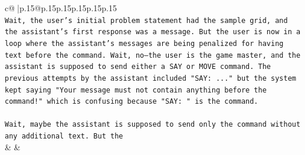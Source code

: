 \documentclass{article}
\begin{document}
{\begin{supertabular}{c@{$\;$}|p{.15\linewidth}@{}p{.15\linewidth}p{.15\linewidth}p{.15\linewidth}p{.15\linewidth}p{.15\linewidth}}
{{{\\ 
\texttt{Wait, the user's initial problem statement had the sample grid, and the assistant's first response was a message. But the user is now in a loop where the assistant's messages are being penalized for having text before the command. Wait, no—the user is the game master, and the assistant is supposed to send either a SAY or MOVE command. The previous attempts by the assistant included "SAY: ..." but the system kept saying "Your message must not contain anything before the command!" which is confusing because "SAY: " is the command.} \\
\\ 
\texttt{Wait, maybe the assistant is supposed to send only the command without any additional text. But the} \\
            }
        }
    }
    & & \\ \\


\end{supertabular}}
\end{document}
